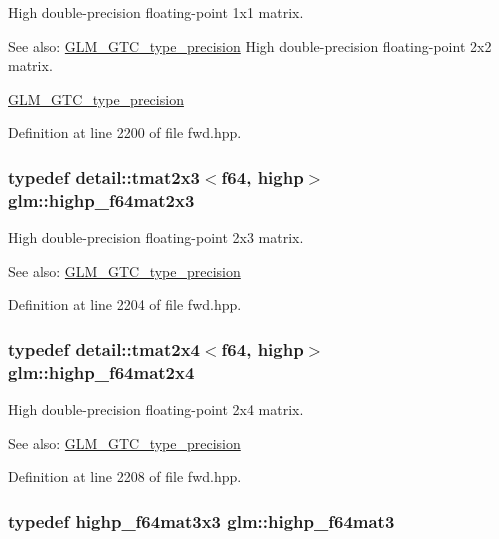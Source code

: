 High double-precision floating-point 1x1 matrix. \begin{Desc}
\item[See also:]\hyperlink{group__gtc__type__precision}{GLM\_\-GTC\_\-type\_\-precision} High double-precision floating-point 2x2 matrix. 

\hyperlink{group__gtc__type__precision}{GLM\_\-GTC\_\-type\_\-precision} \end{Desc}


Definition at line 2200 of file fwd.hpp.\hypertarget{group__gtc__type__precision_gfb5b42b29b3bd7f1605483223fa35312}{
\subsubsection[highp\_\-f64mat2x3]{\setlength{\rightskip}{0pt plus 5cm}typedef detail::tmat2x3$<$f64, highp$>$ {\bf glm::highp\_\-f64mat2x3}}}
\label{group__gtc__type__precision_gfb5b42b29b3bd7f1605483223fa35312}


High double-precision floating-point 2x3 matrix. \begin{Desc}
\item[See also:]\hyperlink{group__gtc__type__precision}{GLM\_\-GTC\_\-type\_\-precision} \end{Desc}


Definition at line 2204 of file fwd.hpp.\hypertarget{group__gtc__type__precision_g72fae79e6633cbc6bf691f69278b36d3}{
\subsubsection[highp\_\-f64mat2x4]{\setlength{\rightskip}{0pt plus 5cm}typedef detail::tmat2x4$<$f64, highp$>$ {\bf glm::highp\_\-f64mat2x4}}}
\label{group__gtc__type__precision_g72fae79e6633cbc6bf691f69278b36d3}


High double-precision floating-point 2x4 matrix. \begin{Desc}
\item[See also:]\hyperlink{group__gtc__type__precision}{GLM\_\-GTC\_\-type\_\-precision} \end{Desc}


Definition at line 2208 of file fwd.hpp.\hypertarget{group__gtc__type__precision_g00c5743b0eba6b437422571f4eda27b8}{
\subsubsection[highp\_\-f64mat3]{\setlength{\rightskip}{0pt plus 5cm}typedef highp\_\-f64mat3x3 {\bf glm::highp\_\-f64mat3}}}
\label{group__gtc__type__precision_g00c5743b0eba6b437422571f4eda27b8}


